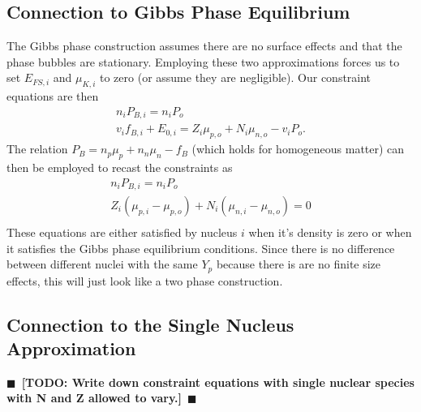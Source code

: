 \documentclass[11pt,letter]{article}
\newcommand{\todo}[1]{{$\blacksquare$~\textbf{\color{blue}[TODO: #1]}}~$\blacksquare$}
\begin{document}
\subsection{Connection to Gibbs Phase Equilibrium}
The Gibbs phase construction assumes there are no surface effects and that the
phase bubbles are stationary.  Employing these two approximations forces us to
set $E_{FS,i}$ and $\mu_{K,i}$ to zero (or assume they are negligible).  Our
constraint equations are then \begin{eqnarray}
n_i P_{B,i} = n_i P_o \\ 
v_i f_{B,i} + E_{0,i} =  Z_i \mu_{p,o} + N_i \mu_{n,o} - v_i P_o.
\end{eqnarray}
The relation $P_B = n_p \mu_p + n_n \mu_n - f_B$ (which holds for 
homogeneous matter) can then be employed to recast
the constraints as \begin{eqnarray}
n_i P_{B,i} = n_i P_o \\ 
Z_i \left(\mu_{p,i} - \mu_{p,o}\right) + N_i \left(\mu_{n,i} - \mu_{n,o}\right) = 0\\
\end{eqnarray}
These equations are either satisfied by nucleus $i$ when it's density is zero or
when it satisfies the Gibbs phase equilibrium conditions.  Since there is no
difference between different nuclei with the same $Y_p$ because there is are no
finite size effects, this will just look like a two phase construction.    

\subsection{Connection to the Single Nucleus Approximation} 
\todo{Write down constraint equations with single nuclear species with N and Z 
allowed to vary.}
\end{document}
